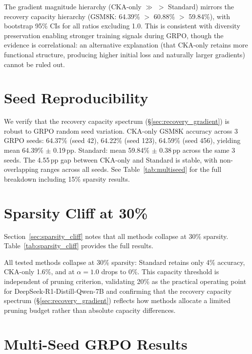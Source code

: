 The gradient magnitude hierarchy (CKA-only $\gg$ \rasp{} $>$ Standard) mirrors the recovery capacity hierarchy (GSM8K: 64.39\% $>$ 60.88\% $>$ 59.84\%), with bootstrap 95\% CIs for all ratios excluding 1.0.
This is consistent with diversity preservation enabling stronger training signals during GRPO, though the evidence is correlational: an alternative explanation (that CKA-only retains more functional structure, producing higher initial loss and naturally larger gradients) cannot be ruled out.

\section{Seed Reproducibility}
\label{sec:appendix_seed}

We verify that the recovery capacity spectrum (\S\ref{sec:recovery_gradient}) is robust to GRPO random seed variation.
CKA-only GSM8K accuracy across 3 GRPO seeds: 64.37\% (seed 42), 64.22\% (seed 123), 64.59\% (seed 456), yielding mean 64.39\% $\pm$ 0.19\,pp.
Standard: mean 59.84\% $\pm$ 0.38\,pp across the same 3 seeds.
The 4.55\,pp gap between CKA-only and Standard is stable, with non-overlapping ranges across all seeds.
See Table~\ref{tab:multiseed} for the full breakdown including 15\% sparsity results.

\section{Sparsity Cliff at 30\%}
\label{sec:appendix_sparsity_cliff}

Section~\ref{sec:sparsity_cliff} notes that all methods collapse at 30\% sparsity. Table~\ref{tab:sparsity_cliff} provides the full results.



All tested methods collapse at 30\% sparsity: Standard retains only 4\% accuracy, CKA-only 1.6\%, and \rasp{} at $\alpha{=}1.0$ drops to 0\%.
This capacity threshold is independent of pruning criterion, validating 20\% as the practical operating point for DeepSeek-R1-Distill-Qwen-7B and confirming that the recovery capacity spectrum (\S\ref{sec:recovery_gradient}) reflects how methods allocate a limited pruning budget rather than absolute capacity differences.

\section{Multi-Seed GRPO Results}
\label{sec:appendix_multiseed}

